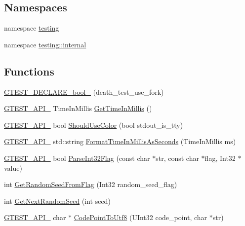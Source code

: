 \subsection*{\-Namespaces}
\begin{DoxyCompactItemize}
\item 
namespace \hyperlink{namespacetesting}{testing}
\item 
namespace \hyperlink{namespacetesting_1_1internal}{testing\-::internal}
\end{DoxyCompactItemize}
\subsection*{\-Functions}
\begin{DoxyCompactItemize}
\item 
\hyperlink{namespacetesting_ad18df0380e9015a496c410c30e66b0e1}{\-G\-T\-E\-S\-T\-\_\-\-D\-E\-C\-L\-A\-R\-E\-\_\-bool\-\_\-} (death\-\_\-test\-\_\-use\-\_\-fork)
\item 
\hyperlink{gtest-port_8h_aa73be6f0ba4a7456180a94904ce17790}{\-G\-T\-E\-S\-T\-\_\-\-A\-P\-I\-\_\-} \-Time\-In\-Millis \hyperlink{namespacetesting_1_1internal_ae0c6fd4543c65945515c42d6f43cc138}{\-Get\-Time\-In\-Millis} ()
\item 
\hyperlink{gtest-port_8h_aa73be6f0ba4a7456180a94904ce17790}{\-G\-T\-E\-S\-T\-\_\-\-A\-P\-I\-\_\-} bool \hyperlink{namespacetesting_1_1internal_ab0f928e61ab8ec92e75ddfcae9324c1e}{\-Should\-Use\-Color} (bool stdout\-\_\-is\-\_\-tty)
\item 
\hyperlink{gtest-port_8h_aa73be6f0ba4a7456180a94904ce17790}{\-G\-T\-E\-S\-T\-\_\-\-A\-P\-I\-\_\-} std\-::string \hyperlink{namespacetesting_1_1internal_a5802d68a85d566a0c82a0df5fd2aa58b}{\-Format\-Time\-In\-Millis\-As\-Seconds} (\-Time\-In\-Millis ms)
\item 
\hyperlink{gtest-port_8h_aa73be6f0ba4a7456180a94904ce17790}{\-G\-T\-E\-S\-T\-\_\-\-A\-P\-I\-\_\-} bool \hyperlink{namespacetesting_1_1internal_a082f2d6b59adc025b035b2c51b0fc47e}{\-Parse\-Int32\-Flag} (const char $\ast$str, const char $\ast$flag, \-Int32 $\ast$value)
\item 
int \hyperlink{namespacetesting_1_1internal_a968b1b4479cfbc49079f9a06fe37d5ba}{\-Get\-Random\-Seed\-From\-Flag} (\-Int32 random\-\_\-seed\-\_\-flag)
\item 
int \hyperlink{namespacetesting_1_1internal_ae2fa5c0c84f0feabbd41ebc1dc208c84}{\-Get\-Next\-Random\-Seed} (int seed)
\item 
\hyperlink{gtest-port_8h_aa73be6f0ba4a7456180a94904ce17790}{\-G\-T\-E\-S\-T\-\_\-\-A\-P\-I\-\_\-} char $\ast$ \hyperlink{namespacetesting_1_1internal_ae994812b6d35cea374d4f9754afc1659}{\-Code\-Point\-To\-Utf8} (\-U\-Int32 code\-\_\-point, char $\ast$str)

\end{DoxyCompactItemize}
